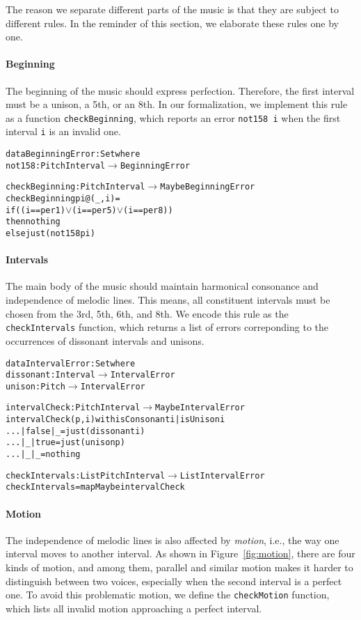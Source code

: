 The reason we separate different parts of the music is that they are
subject to different rules.
In the reminder of this section, we elaborate these rules one by one.

\paragraph{Beginning}
The beginning of the music should express perfection.
Therefore, the first interval must be a unison, a 5th, or an 8th.
In our formalization, we implement this rule as a function
\texttt{checkBeginning}, which reports an error \texttt{not158 i}
when the first interval \texttt{i} is an invalid one.

\begin{alltt}
data BeginningError : Set where
  not158   : PitchInterval \(\rightarrow\) BeginningError
  
checkBeginning : PitchInterval \(\rightarrow\) Maybe BeginningError
checkBeginning pi@(_ , i) =
  if ((i == per1) \(\vee\) (i == per5) \(\vee\) (i == per8))
  then nothing
  else just (not158 pi)
\end{alltt}

\paragraph{Intervals}
The main body of the music should maintain harmonical consonance
and independence of melodic lines.
This means, all constituent intervals must be chosen from the 3rd,
5th, 6th, and 8th.
We encode this rule as the \texttt{checkIntervals} function,
which returns a list of errors correponding to the occurrences of
dissonant intervals and unisons.

\begin{alltt}
data IntervalError : Set where
  dissonant : Interval \(\rightarrow\) IntervalError
  unison    : Pitch \(\rightarrow\) IntervalError

intervalCheck : PitchInterval \(\rightarrow\) Maybe IntervalError
intervalCheck (p , i) with isConsonant i | isUnison i
... | false | _    = just (dissonant i)
... | _     | true = just (unison p)
... | _     | _    = nothing

checkIntervals : List PitchInterval \(\rightarrow\) List IntervalError
checkIntervals = mapMaybe intervalCheck
\end{alltt}

\paragraph{Motion}
The independence of melodic lines is also affected by \emph{motion},
i.e., the way one interval moves to another interval.
As shown in Figure~\ref{fig:motion}, there are four kinds of motion,
and among them, parallel and similar motion makes it harder to
distinguish between two voices, especially when the second interval
is a perfect one.
To avoid this problematic motion, we define the \texttt{checkMotion}
function, which lists all invalid motion approaching a perfect interval.

